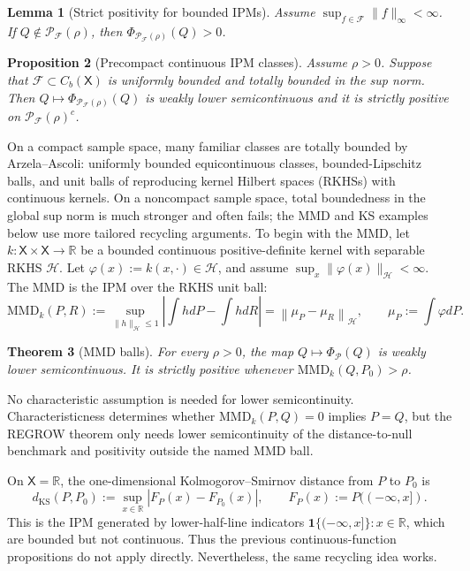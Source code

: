 \documentclass[11pt]{article}
\newcommand{\KS}{\mathrm{KS}}
\newcommand{\MMD}{\mathrm{MMD}}
\newcommand{\RR}{\mathbb{R}}
\newcommand{\Pcal}{\mathcal{P}}
\newcommand{\Fcal}{\mathcal{F}}
\newcommand{\X}{\mathsf{X}}
\newcommand{\dd}{d}
\newcommand{\one}{\mathbf{1}}
\newtheorem{theorem}{Theorem}[section]
\newtheorem{proposition}[theorem]{Proposition}
\newtheorem{lemma}[theorem]{Lemma}
\theoremstyle{definition}
\theoremstyle{definition}
\begin{document}
\begin{lemma}[Strict positivity for bounded IPMs]\label{lem:ipm-positive}
Assume \(\sup_{f\in\Fcal}\|f\|_\infty<\infty\).  If \(Q\notin\Pcal_{\Fcal}(\rho)\), then \(\Phi_{\Pcal_{\Fcal}(\rho)}(Q)>0\).
\end{lemma}

\begin{proposition}[Precompact continuous IPM classes]\label{prop:precompact-F}
Assume \(\rho>0\).  Suppose that \(\Fcal\subset C_b(\X)\) is uniformly bounded and totally bounded in the sup norm.  Then \(Q\mapsto\Phi_{\Pcal_{\Fcal}(\rho)}(Q)\) is weakly lower semicontinuous and it is strictly positive on \(\Pcal_{\Fcal}(\rho)^c\).
\end{proposition}

On a compact sample space, many familiar classes are totally bounded by Arzela--Ascoli: uniformly bounded equicontinuous classes, bounded-Lipschitz balls, and unit balls of reproducing kernel Hilbert spaces (RKHSs) with continuous kernels.  On a noncompact sample space, total boundedness in the global sup norm is much stronger and often fails; the MMD and KS examples below use more tailored recycling arguments.
To begin with the MMD, let \(k:\X\times\X\to\RR\) be a bounded continuous positive-definite kernel with separable RKHS \(\mathcal H\).  Let \(\varphi(x):=k(x,\cdot)\in\mathcal H\), and assume \(\sup_x\|\varphi(x)\|_{\mathcal H}<\infty\).  The MMD is the IPM over the RKHS unit ball:
\[
  \MMD_k(P,R)
  :=\sup_{\|h\|_{\mathcal H}\le1}\left|\int h\dd P-\int h\dd R\right|
  =\left\|\mu_P-\mu_R\right\|_{\mathcal H},
  \qquad
  \mu_P:=\int\varphi\dd P.
\]

\begin{theorem}[MMD balls]\label{prop:mmd-lsc}
For every \(\rho>0\), the map
\(
Q\mapsto\Phi_{\Pcal}(Q)
\)
is weakly lower semicontinuous.  It is strictly positive whenever \(\MMD_k(Q,P_0)>\rho\).
\end{theorem}

No characteristic assumption is needed for lower semicontinuity.  Characteristicness determines whether \(\MMD_k(P,Q)=0\) implies \(P=Q\), but the REGROW theorem only needs lower semicontinuity of the distance-to-null benchmark and positivity outside the named MMD ball.


On \(\X=\RR\), the one-dimensional Kolmogorov--Smirnov distance from \(P\) to \(P_0\) is
\[
  d_{\KS}(P,P_0):=\sup_{x\in\RR}|F_P(x)-F_{P_0}(x)|,
  \qquad F_P(x):=P((-
\infty,x]).
\]
This is the IPM generated by lower-half-line indicators \(\one\{(-\infty,x]\}:x\in\RR\), which are bounded but not continuous.  Thus the previous continuous-function propositions do not apply directly.  Nevertheless, the same recycling idea works.
\end{document}
